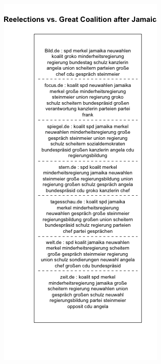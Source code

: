 \documentclass[12pt,a4paper,notitlepage]{article}
\begin{document}
{%
\begin{figure}[H]
	\begin{center}
		\begin{subfigure}[normla]{0.49\textwidth}
			\includegraphics[width=\textwidth]{../figs/plotquote26.png}

\end{subfigure}
\end{center}
\end{figure}}
\end{document}
